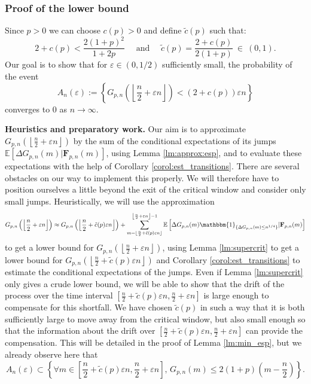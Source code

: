 \documentclass[a4, 11pt]{article}
\numberwithin{equation}{section}
\theoremstyle{plain}
\theoremstyle{definition}
\theoremstyle{remark}
\begin{document}
\subsubsection{Proof of the lower bound}

Since $p>0$ we can choose $c(p)>0$ and define $\tilde c(p)$ such that:
$$
2+c(p) <\frac{2(1+p)^2}{1+2p} \quad \text{ and } \quad \tilde{c}(p)=\frac{2+c(p)}{2(1+p)}~\in~(0,1). 
$$
Our goal is to show that for $\varepsilon\in \left(0,1/2\right)$ sufficiently small,  the probability of the event
$$A_n(\varepsilon):=\left\{G_{p,n}\left( \left\lfloor\frac{n}{2}+\varepsilon n\right\rfloor \right) < (2+c(p))\varepsilon n \right\}$$
converges to 0 as $n \rightarrow \infty$.

\textbf{Heuristics and preparatory work.} Our aim is to approximate  $G_{p,n}\left(\left\lfloor \frac{n}{2}+\varepsilon n\right\rfloor\right)$ by the sum of the conditional expectations of its jumps $\mathbb{E}\left[\Delta G_{p,n}(m)\vert \mathbf{F}_{p,n}(m)\right]$, using 
Lemma \ref{lm:approx:esp}, and to evaluate these expectations with the help of Corollary \ref{corol:est_transitions}. There are several obstacles on our way to implement this properly. We will therefore have to position ourselves a little beyond the exit of the critical window and consider only small jumps. Heuristically, we will use the approximation
\begin{equation*}
	G_{p,n}\left(\left\lfloor \frac{n}{2}+\varepsilon n\right\rfloor\right)\approx G_{p,n}\left(\left\lfloor \frac{n}{2}+\tilde{c}(p)\varepsilon n\right\rfloor\right)+\sum_{m=\lfloor \frac{n}{2}+\tilde{c}(p)\varepsilon n\rfloor}^{\left\lfloor \frac{n}{2}+\varepsilon n\right\rfloor-1} \mathbb{E}\left[\Delta G_{p,n}(m)\mathbbm{1}_{\{\Delta G_{p,n}(m)\leq n^{1/4}\}}\vert \mathbf{F}_{p,n}(m)\right]\label{eq:heurist_approx}
\end{equation*}
to get a lower bound for  $G_{p,n}\left(\left\lfloor \frac{n}{2}+\varepsilon n\right\rfloor\right)$, using Lemma \ref{lm:supercrit} to get a lower bound for $G_{p,n}\left(\left\lfloor \frac{n}{2}+\tilde{c}(p)\varepsilon n\right\rfloor\right)$ and Corollary \ref{corol:est_transitions} to estimate the conditional  expectations of the jumps. Even if Lemma \ref{lm:supercrit} only gives a crude lower bound, we will be able to show that the drift of the process over the time interval $\left[\frac{n}{2}+\tilde{c}(p)\varepsilon n,\frac{n}{2}+\varepsilon n\right]$ is large enough to compensate for this shortfall. We have chosen $\tilde{c}(p)$ in such a way that it is both sufficiently large to move away from the critical window, but also small enough so that the information about the drift over $\left[\frac{n}{2}+\tilde{c}(p)\varepsilon n,\frac{n}{2}+\varepsilon n\right]$ can provide the compensation. This will be detailed in the proof of Lemma \ref{lm:min_esp}, but we already observe here that 
\begin{equation}\label{eq:inclusion_An}
	A_n(\varepsilon)\subset \left\{\forall m\in \left[\frac{n}{2}+\tilde{c}(p)\varepsilon n,\frac{n}{2}+\varepsilon n   \right],\, G_{p,n}(m)\leq 2(1+p)\left(m-\frac{n}{2}\right)  \right\}.
\end{equation} 
\end{document}
